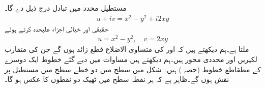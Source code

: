 مستطیل محدد میں تبادل  درج ذیل دے گا۔
\begin{align*}
u+iv=x^2-y^2+i2xy
\end{align*}
حقیقی اور خیالی اجزاء علیحدہ کرتے ہوئے 
\begin{align}\label{مساوات_نقش_مربع_ب}
u=x^2-y^2,\quad v=2xy
\end{align}
ملتا ہے۔ہم دیکھتے ہیں کہ  اور  کی  متساوی الاضلاع قطع زائد ہوں گے جن کی متقارب لکیریں  اور محددی محور ہیں۔ہم دیکھتے ہیں مساوات  میں دیے گئے  خطوط ایک دوسرے کے   مطقاطع خطوط (حصہ ) ہیں۔ شکل  میں  سطح میں دو خطے  سطح میں مستطیل پر نقش ہوں گے۔ظاہر ہے کہ ہر نقطہ  سطح  میں ٹھیک  دو نقطوں کا عکس ہو گا۔

